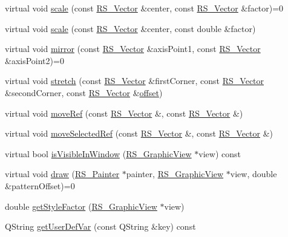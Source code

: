 \begin{DoxyCompactItemize}
\item 
virtual void \hyperlink{classRS__Entity_af5e5a5aeb24c4aa36551a8ffd85f37c4}{scale} (const \hyperlink{classRS__Vector}{R\-S\-\_\-\-Vector} \&center, const \hyperlink{classRS__Vector}{R\-S\-\_\-\-Vector} \&factor)=0
\item 
virtual void \hyperlink{classRS__Entity_a43c690498b577a01ba53502fcbbf68fc}{scale} (const \hyperlink{classRS__Vector}{R\-S\-\_\-\-Vector} \&center, const double \&factor)
\item 
virtual void \hyperlink{classRS__Entity_aacac9a2093cda79d19e72dfb854ae869}{mirror} (const \hyperlink{classRS__Vector}{R\-S\-\_\-\-Vector} \&axis\-Point1, const \hyperlink{classRS__Vector}{R\-S\-\_\-\-Vector} \&axis\-Point2)=0
\item 
virtual void \hyperlink{classRS__Entity_a9bbc7b95a479ff9c8ff74671f0d160e9}{stretch} (const \hyperlink{classRS__Vector}{R\-S\-\_\-\-Vector} \&first\-Corner, const \hyperlink{classRS__Vector}{R\-S\-\_\-\-Vector} \&second\-Corner, const \hyperlink{classRS__Vector}{R\-S\-\_\-\-Vector} \&\hyperlink{classRS__Entity_aa296d21b9aac99161d386ce2f60f0fea}{offset})
\item 
virtual void \hyperlink{classRS__Entity_a7bfc201e4cea8d2d74c6e33bd96838f6}{move\-Ref} (const \hyperlink{classRS__Vector}{R\-S\-\_\-\-Vector} \&, const \hyperlink{classRS__Vector}{R\-S\-\_\-\-Vector} \&)
\item 
virtual void \hyperlink{classRS__Entity_a972766e18d187f3c6bd28fc69290a19f}{move\-Selected\-Ref} (const \hyperlink{classRS__Vector}{R\-S\-\_\-\-Vector} \&, const \hyperlink{classRS__Vector}{R\-S\-\_\-\-Vector} \&)
\item 
virtual bool \hyperlink{classRS__Entity_a78b0bc33077ec1df8db171e4a8daeb20}{is\-Visible\-In\-Window} (\hyperlink{classRS__GraphicView}{R\-S\-\_\-\-Graphic\-View} $\ast$view) const 
\item 
virtual void \hyperlink{classRS__Entity_aa25c046c41fe29df1f65591e6cb54093}{draw} (\hyperlink{classRS__Painter}{R\-S\-\_\-\-Painter} $\ast$painter, \hyperlink{classRS__GraphicView}{R\-S\-\_\-\-Graphic\-View} $\ast$view, double \&pattern\-Offset)=0
\item 
double \hyperlink{classRS__Entity_af7747c51a0bca4115f55a901945f7b1c}{get\-Style\-Factor} (\hyperlink{classRS__GraphicView}{R\-S\-\_\-\-Graphic\-View} $\ast$view)
\item 
Q\-String \hyperlink{classRS__Entity_abfb9cffffb54332aa0276c9040ec2633}{get\-User\-Def\-Var} (const Q\-String \&key) const 
\item 

\end{DoxyCompactItemize}
